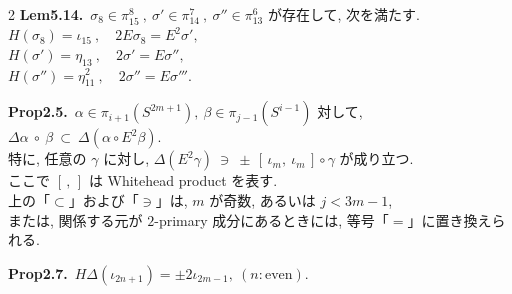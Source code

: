 \documentclass[10pt, leqno]{ltjsarticle}
\numberwithin{equation}{section}
\theoremstyle{plain}
\theoremstyle{definition}
\theoremstyle{remark}
\begin{document}
\begin{paracol}{2}
\noindent
\textbf{Lem5.14.}\
\(\sigma_{8}\in\pi^{8}_{15}\ , \ \sigma'\in\pi^{7}_{14}\ , \ \sigma''\in\pi^{6}_{13}\) 
が存在して, 次を満たす. \\
\(H(\sigma_{8})=\iota_{15} \ ,\quad 2E\sigma_{8}=E^{2}\sigma',\)\\
\(H(\sigma')=\eta_{13} \ ,\quad 2\sigma'=E\sigma'',\)\\
\(H(\sigma'')=\eta_{11}^2 \ ,\quad 2\sigma''=E\sigma''' .\)

\noindent
\textbf{Prop2.5.}\
$\alpha\in\pi_{i+1}(S^{2m+1}), \ \beta\in \pi_{j-1}(S^{i-1})$ 対して, 
\(
\Delta\alpha\ \circ\ \beta\ \subset\ \Delta(\alpha\circ E^2\beta).
\)\\
特に, 任意の $\gamma$ に対し,
\(
\Delta(E^2\gamma)\ \ni\ \pm\,[\,\iota_m,\ \iota_m\,]\circ\gamma
\)
が成り立つ. \\
ここで $[\, ,\,]$ は Whitehead product を表す. \\
上の「$\subset$」および「$\ni$」は, $m$ が奇数, 
あるいは $j<3m-1$, \\
または, 関係する元が \(2\)-primary 成分にあるときには, 
等号「$=$」に置き換えられる. 

\noindent
\textbf{Prop2.7.}\
\(H\Delta(\iota_{2n+1}) = \pm2\iota_{2m-1},\ (n:\text{even})\).







\end{paracol}
\end{document}
